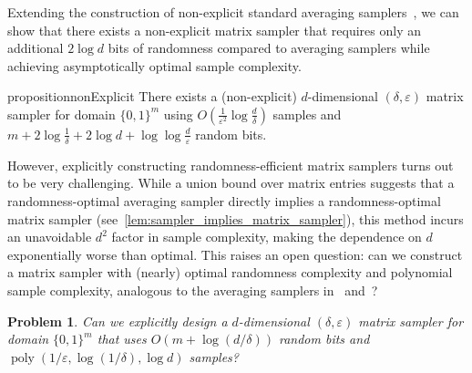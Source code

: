 \documentclass[10pt,a4paper]{article}
\newtheorem{problem}{Problem}
\DeclareMathOperator*{\poly}{poly}
\newcommand{\eps}{\varepsilon}
\newcommand{\1}{\mathbbm{1}}
\newcommand{\zo}{\{0, 1\}}
\begin{document}

Extending the construction of non-explicit standard averaging samplers~\cite{CEG95}, we can show that there exists a non-explicit matrix sampler that requires only an additional $2 \log d$ bits of randomness compared to averaging samplers while achieving asymptotically optimal sample complexity.
\begin{restatable}{proposition}{nonExplicit}
    \label{prop:non_explicit}
    There exists a (non-explicit) $d$-dimensional $(\delta, \eps)$ matrix sampler for domain $\zo^m$ using $O(\frac{1}{\eps^2}\log\frac{d}{\delta})$ samples and $m + 2\log\frac{1}{\delta} + 2 \log d + \log \log \frac{d}{\eps}$ random bits.
\end{restatable}
However, explicitly constructing randomness-efficient matrix samplers turns out to be very challenging. While a union bound over matrix entries suggests that a randomness-optimal averaging sampler directly implies a randomness-optimal matrix sampler (see~\cref{lem:sampler_implies_matrix_sampler}), this method incurs an unavoidable $d^2$ factor in sample complexity, making the dependence on $d$ exponentially worse than optimal.
This raises an open question: can we construct a matrix sampler with (nearly) optimal randomness complexity and polynomial sample complexity, analogous to the averaging samplers in~\cite{bellare1994randomness} and~\cite{zuckerman1997randomness}? 

\begin{problem}
    \label{problem2}
    Can we explicitly design a $d$-dimensional $(\delta, \eps)$ matrix sampler for domain $\zo^m$ that uses $O(m + \log(d / \delta))$ random bits and $\poly(1/\eps, \log(1 / \delta), \log d)$ samples?
\end{problem}
\end{document}
